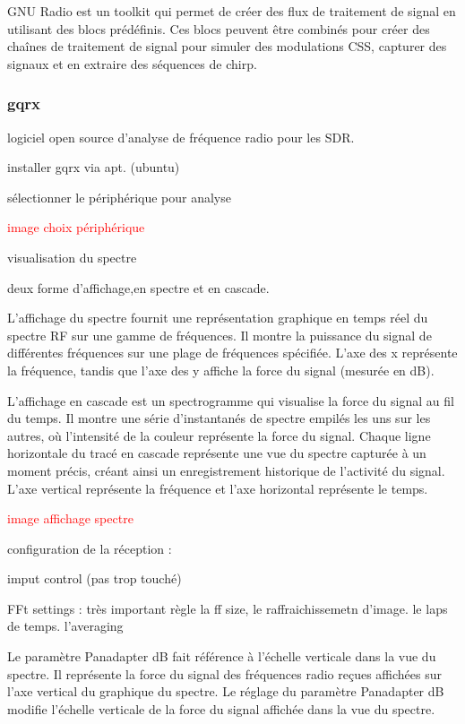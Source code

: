 GNU Radio est un toolkit qui permet de créer des flux de traitement de signal en utilisant des blocs prédéfinis. Ces blocs peuvent être combinés pour créer des chaînes de traitement de signal pour simuler des modulations CSS, capturer des signaux et en extraire des séquences de chirp.

\subsubsection{gqrx}

logiciel open source d'analyse de fréquence radio pour les SDR.

installer gqrx via apt. (ubuntu)

sélectionner le périphérique pour analyse

\textcolor{red}{image choix périphérique}

visualisation du spectre

deux forme d'affichage,en spectre et en cascade.

L'affichage du spectre fournit une représentation graphique en temps réel du spectre RF sur une gamme de fréquences.
Il montre la puissance du signal de différentes fréquences sur une plage de fréquences spécifiée.
L'axe des x représente la fréquence, tandis que l'axe des y affiche la force du signal (mesurée en dB).

L'affichage en cascade est un spectrogramme qui visualise la force du signal au fil du temps.
Il montre une série d'instantanés de spectre empilés les uns sur les autres, où l'intensité de la couleur représente la force du signal.
Chaque ligne horizontale du tracé en cascade représente une vue du spectre capturée à un moment précis, créant ainsi un enregistrement historique de l'activité du signal.
L'axe vertical représente la fréquence et l'axe horizontal représente le temps.

\textcolor{red}{image affichage spectre}

configuration de la réception :

imput control (pas trop touché)

FFt settings : très important règle la ff size, le raffraichissemetn d'image. le laps de temps. l'averaging

Le paramètre Panadapter dB fait référence à l'échelle verticale dans la vue du spectre. Il représente la force du signal des fréquences radio reçues affichées sur l'axe vertical du graphique du spectre. Le réglage du paramètre Panadapter dB modifie l’échelle verticale de la force du signal affichée dans la vue du spectre.

